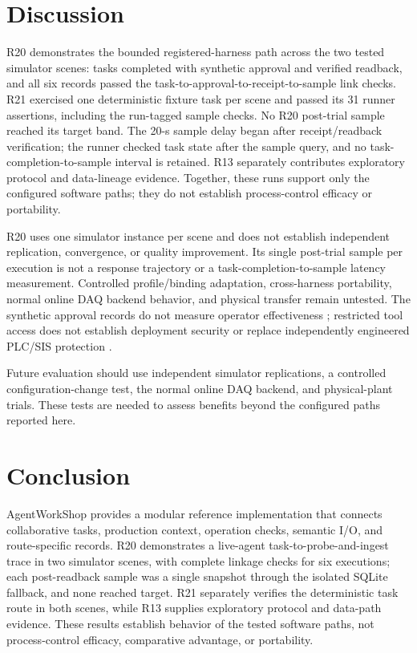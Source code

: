 \section{Discussion}
\label{sec:limits}
R20 demonstrates the bounded registered-harness path across the two tested
simulator scenes: tasks completed with synthetic approval and verified
readback, and all six records passed the task-to-approval-to-receipt-to-sample
link checks. R21 exercised one deterministic fixture task per scene and
passed its 31 runner assertions, including the run-tagged sample checks. No
R20 post-trial sample reached its target band. The 20-s sample delay began
after receipt/readback verification; the runner checked task state after the
sample query, and no task-completion-to-sample interval is retained. R13
separately contributes exploratory protocol and data-lineage evidence.
Together, these runs support only the configured software paths; they do not
establish process-control efficacy or portability.

R20 uses one simulator instance per scene and does not establish independent
replication, convergence, or quality improvement. Its single post-trial
sample per execution is not a response trajectory or a
task-completion-to-sample latency measurement. Controlled profile/binding
adaptation, cross-harness portability, normal online DAQ backend behavior, and
physical transfer remain untested. The synthetic approval records do not
measure operator effectiveness
\cite{parasuramanmanzey2010complacency,parasuraman2000model,bainbridge1983ironies};
restricted tool access does not establish deployment security
\cite{greshake2023injection,liu2024pinjection,iec62443-3-3} or replace
independently engineered PLC/SIS protection \cite{iec61511}.

Future evaluation should use independent simulator replications, a controlled
configuration-change test, the normal online DAQ backend, and physical-plant
trials. These tests are needed to assess benefits beyond the configured paths
reported here.

\section{Conclusion}
\label{sec:conclusion}
AgentWorkShop provides a modular reference implementation that connects
collaborative tasks, production context, operation checks, semantic I/O, and
route-specific records. R20 demonstrates a live-agent task-to-probe-and-ingest
trace in two simulator scenes, with complete linkage checks for six
executions; each post-readback sample was a single snapshot through the
isolated SQLite fallback, and none reached target. R21 separately verifies the
deterministic task route in both scenes, while R13 supplies exploratory
protocol and data-path evidence. These results establish behavior of the
tested software paths, not process-control efficacy, comparative advantage,
or portability.
